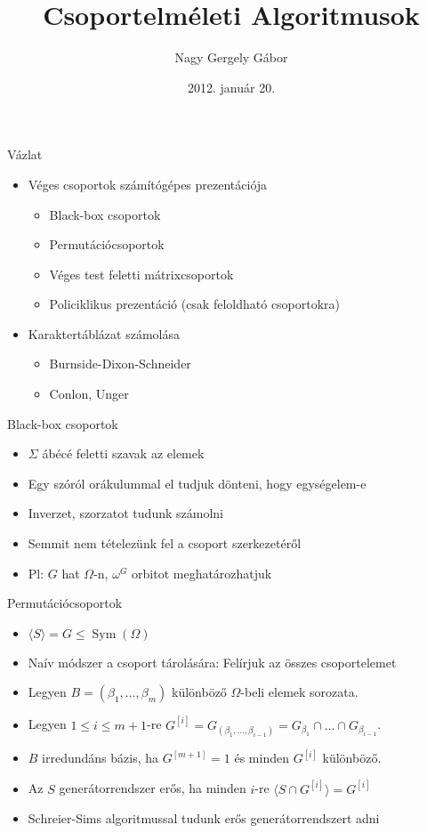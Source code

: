 \documentclass[mathserif]{beamer}
\DeclareMathOperator{\Sym}{Sym}
\begin{document}
\title[Csoportelméleti Algoritmusok]{Csoportelméleti Algoritmusok}
\author{Nagy Gergely Gábor}
\date{2012. január 20.}

\begin{frame}
\titlepage
\end{frame}

\begin{frame}{Vázlat}
\begin{itemize}
\item Véges csoportok számítógépes prezentációja
	\begin{itemize}
	\item Black-box csoportok
	\item Permutációcsoportok
	\item Véges test feletti mátrixcsoportok
	\item Policiklikus prezentáció (csak feloldható csoportokra)
	\end{itemize}
\item Karaktertáblázat számolása
	\begin{itemize}
	\item Burnside-Dixon-Schneider
	\item Conlon, Unger
	\end{itemize}
\end{itemize}
\end{frame}

\begin{frame}{Black-box csoportok}
\begin{itemize}
\item $\Sigma$ ábécé feletti szavak az elemek
\item Egy szóról orákulummal el tudjuk dönteni, hogy egységelem-e
\item Inverzet, szorzatot tudunk számolni
\item Semmit nem tételezünk fel a csoport szerkezetéről
\item Pl: $G$ hat $\Omega$-n, $\omega^G$ orbitot meghatározhatjuk
\end{itemize}
\end{frame}

\begin{frame}{Permutációcsoportok}
\begin{itemize}
\item $\langle S \rangle = G \le \Sym(\Omega)$
\item Naív módszer a csoport tárolására: Felírjuk az összes csoportelemet
\item Legyen $B = (\beta_1, \dots, \beta_m)$ különböző $\Omega$-beli elemek sorozata.
\item Legyen $1\le i\le m+1$-re $G^{[i]} = G_{(\beta_1,\dots,\beta_{i-1})} = G_{\beta_1}\cap\dots\cap G_{\beta_{i-1}}$.
\item $B$ irredundáns bázis, ha $G^{[m+1]}=1$ és minden $G^{[i]}$ különböző.
\item Az $S$ generátorrendszer erős, ha minden $i$-re $\langle S \cap G^{[i]}\rangle = G^{[i]}$
\item Schreier-Sims algoritmussal tudunk erős generátorrendszert adni
\end{itemize}
\end{frame}
\end{document}
